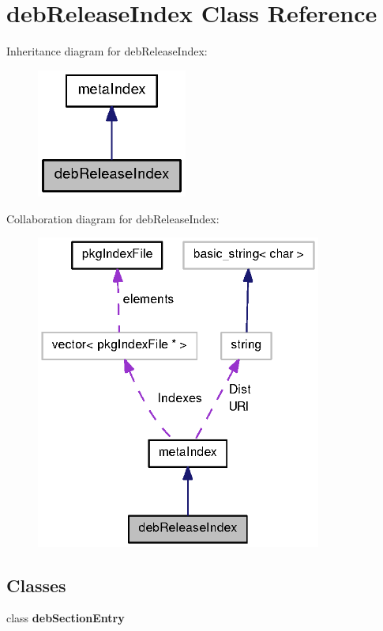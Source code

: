 \section{deb\-Release\-Index \-Class \-Reference}
\label{classdebReleaseIndex}


\-Inheritance diagram for deb\-Release\-Index\-:
\nopagebreak
\begin{figure}[H]
\begin{center}
\leavevmode
\includegraphics[width=140pt]{classdebReleaseIndex__inherit__graph}
\end{center}
\end{figure}


\-Collaboration diagram for deb\-Release\-Index\-:
\nopagebreak
\begin{figure}[H]
\begin{center}
\leavevmode
\includegraphics[width=266pt]{classdebReleaseIndex__coll__graph}
\end{center}
\end{figure}
\subsection*{\-Classes}
\begin{DoxyCompactItemize}
\item 
class {\bf deb\-Section\-Entry}
\end{DoxyCompactItemize}
